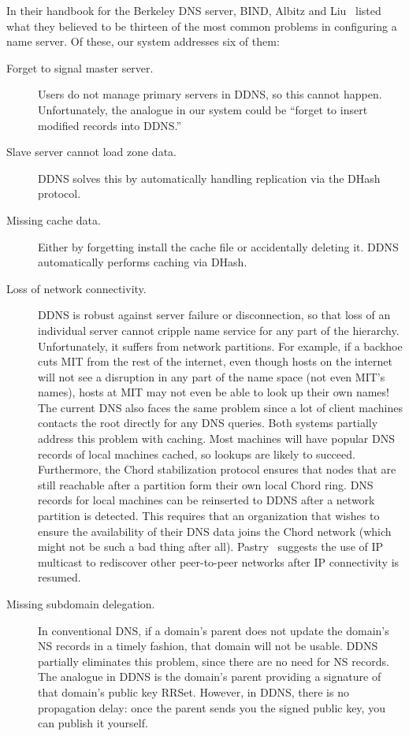 In their handbook for the Berkeley DNS server, BIND,
Albitz and Liu~\cite{dns-bind} listed what they believed to be
thirteen of the most common problems in configuring
a name server.
Of these, our system addresses six of them:
\begin{description}
\item[Forget to signal master server.]
Users do not manage primary servers in DDNS, so this cannot happen.
Unfortunately, the analogue in our system could be ``forget to
insert modified records into DDNS.''

\item[Slave server cannot load zone data.]
DDNS solves this by automatically handling replication 
via the DHash protocol.

\item[Missing cache data.] Either by forgetting install the 
cache file or accidentally deleting it. DDNS automatically 
performs caching via DHash.

\item[Loss of network connectivity.]
DDNS is robust against server failure or disconnection, so that loss of
an individual server cannot cripple name service for any part of the
hierarchy. Unfortunately, it suffers from 
network partitions. For example, if a backhoe cuts MIT from 
the rest of the internet,
even though hosts on the internet will not see a disruption in any
part of the name space (not even MIT's names), hosts at MIT
may not even be able to look up their own names! 
The current DNS also faces the same problem since a lot
of client machines contacts the root directly for any DNS queries.
Both systems partially address this problem with caching.
Most machines will have popular DNS records of local machines
cached, so lookups are likely to succeed.
Furthermore, the Chord stabilization protocol ensures that nodes that 
are still reachable after a partition form their own local 
Chord ring. DNS records for local machines can be reinserted to
DDNS after a network partition is detected. 
This requires that 
an organization that wishes to ensure the availability of their
DNS data joins the Chord network (which might not be such a bad thing after all).
Pastry~\cite{pastry01} suggests the use of IP multicast to rediscover
other peer-to-peer networks after IP connectivity is resumed.

\item[Missing subdomain delegation.]
In conventional DNS, if a domain's parent does not
update the domain's NS records in a timely fashion,
that domain will not be usable.  
DDNS partially eliminates this problem, since there are 
no need for NS records.
The analogue in DDNS is the domain's parent providing a signature
of that domain's public key RRSet.
However, in DDNS, there is no propagation delay: once the
parent sends you the signed public key, you can publish it yourself.


\end{description}
